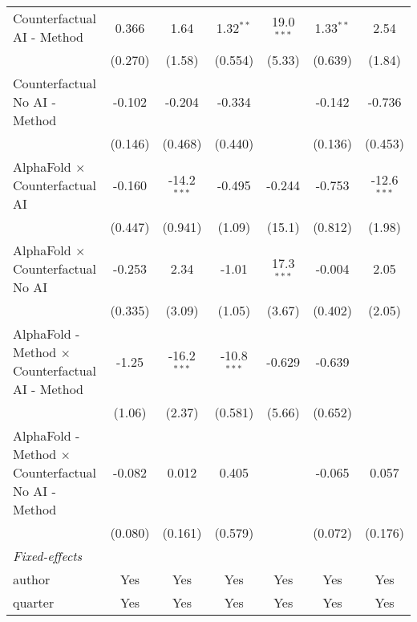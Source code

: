 \begin{tabular}{lcccccc}
   Counterfactual AI - Method                                 & 0.366        & 1.64          & 1.32$^{**}$   & 19.0$^{***}$  & 1.33$^{**}$ & 2.54\\   
                                                              & (0.270)      & (1.58)        & (0.554)       & (5.33)        & (0.639)     & (1.84)\\   
   Counterfactual No AI - Method                              & -0.102       & -0.204        & -0.334        &               & -0.142      & -0.736\\   
                                                              & (0.146)      & (0.468)       & (0.440)       &               & (0.136)     & (0.453)\\   
   AlphaFold $\times$ Counterfactual AI                       & -0.160       & -14.2$^{***}$ & -0.495        & -0.244        & -0.753      & -12.6$^{***}$\\   
                                                              & (0.447)      & (0.941)       & (1.09)        & (15.1)        & (0.812)     & (1.98)\\   
   AlphaFold $\times$ Counterfactual No AI                    & -0.253       & 2.34          & -1.01         & 17.3$^{***}$  & -0.004      & 2.05\\   
                                                              & (0.335)      & (3.09)        & (1.05)        & (3.67)        & (0.402)     & (2.05)\\   
   AlphaFold - Method $\times$ Counterfactual AI - Method     & -1.25        & -16.2$^{***}$ & -10.8$^{***}$ & -0.629        & -0.639      &   \\   
                                                              & (1.06)       & (2.37)        & (0.581)       & (5.66)        & (0.652)     &   \\   
   AlphaFold - Method $\times$ Counterfactual No AI - Method  & -0.082       & 0.012         & 0.405         &               & -0.065      & 0.057\\   
                                                              & (0.080)      & (0.161)       & (0.579)       &               & (0.072)     & (0.176)\\   
   \midrule
   \emph{Fixed-effects}\\
   author                                                     & Yes          & Yes           & Yes           & Yes           & Yes         & Yes\\  
   quarter                                                    & Yes          & Yes           & Yes           & Yes           & Yes         & Yes\\  

\end{tabular}

